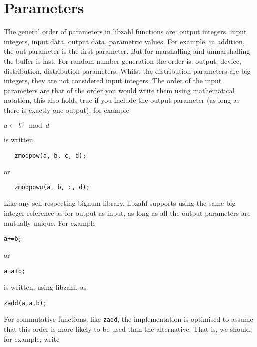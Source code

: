 \newpage
\section{Parameters}
\label{sec:Parameters}

The general order of parameters in libzahl functions
are: output integers, input integers, input data,
output data, parametric values. For example, in
addition, the out parameter is the first parameter.
But for marshalling and unmarshalling the buffer
is last. For random number generation the order is:
output, device, distribution, distribution parameters.
Whilst the distribution parameters are big integers,
they are not considered input integers. The order
of the input parameters are that of the order you
would write them using mathematical notation, this
also holds true if you include the output parameter
(as long as there is exactly one output), for example

\vspace{1em}
$a \gets b^c \mod d$
\vspace{1em}

\noindent
is written

\begin{verbatim}
   zmodpow(a, b, c, d);
\end{verbatim}

\noindent
or

\begin{verbatim}
   zmodpowu(a, b, c, d);
\end{verbatim}

Like any self respecting bignum library, libzahl
supports using the same big integer reference as
for output as input, as long as all the output
parameters are mutually unique. For example

\begin{alltt}
   a += b;
\end{alltt}

\noindent
or

\begin{alltt}
   a = a + b;
\end{alltt}

\noindent
is written, using libzahl, as

\begin{alltt}
   zadd(a, a, b);
\end{alltt}

For commutative functions, like {\tt zadd}, the
implementation is optimised to assume that this
order is more likely to be used than the alternative.
That is, we should, for example, write

